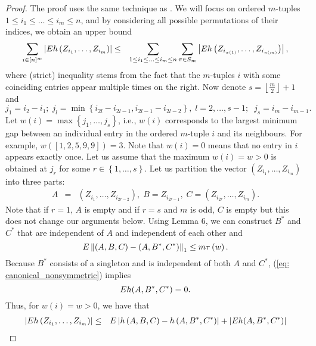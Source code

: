 \begin{proof} 
The proof uses the same technique as  \cite[Lemma 3]{arcones1998law}.
 We will focus on ordered $m$-tuples $1\leq i_{1}\leq\ldots\leq i_{m}\leq n$,
and by considering all possible permutations of their indices, we
obtain an upper bound 
\begin{eqnarray}
\sum_{i\in[n]^{m}}\left|E h\left(Z_{i_{1}},\ldots,Z_{i_{m}}\right)\right| & \leq & \sum_{1\leq i_{1}\leq\ldots\leq i_{m}\leq n}\sum_{\pi\in S_{m}}\left|E h\left(Z_{i_{\pi(1)}},\ldots,Z_{i_{\pi(m)}}\right)\right|,\label{eq: ABCLemma_firstInequality}
\end{eqnarray}
where (strict) inequality stems from the fact that the $m$-tuples
$i$ with some coinciding entries appear multiple times on the right.
Now denote $s=\left\lfloor \frac{m}{2}\right\rfloor +1$ and
\[
j_{1}=i_{2}-i_{1};\; j_{l}=\min\left\{ i_{2l}-i_{2l-1},i_{2l-1}-i_{2l-2}\right\} ,\; l=2,\ldots,s-1;\;\; j_{s}=i_{m}-i_{m-1}.
\]
Let $w(i)=\max\left\{ j_{1},\ldots,j_{s}\right\} $, i.e., $w(i)$
corresponds to the largest minimum gap between an individual entry
in the ordered $m$-tuple $i$ and its neighbours. For example, $w\left(\left[1,2,5,9,9\right]\right)=3$.
Note that $w(i)=0$ means that no entry in $i$ appears exactly once.
Let us assume that the maximum $w(i)=w>0$ is obtained at $j_{r}$
for some $r\in\left\{ 1,\ldots,s\right\} $. Let us partition the
vector $\left(Z_{i_{1}},\ldots,Z_{i_{m}}\right)$ into three parts:
\begin{eqnarray*}
A & = & \left(Z_{i_{1}},\ldots,Z_{i_{2r-2}}\right),\; B=Z_{i_{2r-1}},\; C=\left(Z_{i_{2r}},\ldots,Z_{i_{m}}\right).
\end{eqnarray*}
Note that if $r=1$, $A$ is empty and if $r=s$ and $m$ is odd,
$C$ is empty but this does not change our arguments below. Using
Lemma 6, we can construct $B^{*}$ and $C^{*}$ that are independent
of $A$ and independent of each other and 
\begin{equation}
E \left\Vert \left(A,B,C\right)-\left(A,B^{*},C^{*}\right)\right\Vert _{1}\leq m\tau\left(w\right).\label{eq: ABCLemma_property1}
\end{equation}
Because $B^{*}$ consists of a singleton and is independent of both
$A$ and $C^{*}$, (\ref{eq: canonical_nonsymmetric}) implies 
\begin{equation}
E h(A,B^{*},C^{*})=0.\label{eq: ABCLemma_property2}
\end{equation}
Thus, for $w(i)=w>0$, we have that
\begin{eqnarray*}
\left|\ev h\left(Z_{i_{1}},\ldots,Z_{i_{m}}\right)\right| & \leq & \ev \left|h\left(A,B,C\right)-h\left(A,B^{*},C^{*}\right)\right|+\left|\ev h(A,B^{*},C^{*})\right|\\

\end{eqnarray*}
\end{proof}
